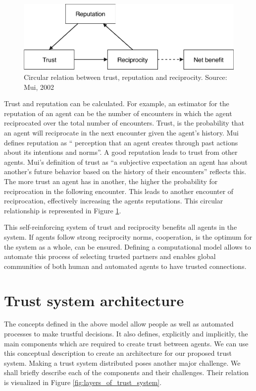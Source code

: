 \begin{figure}[h!]
    \centering
    \includegraphics[width=\textwidth]{images/mui_figure.pdf}
    \caption{Circular relation between trust, reputation and reciprocity. Source: Mui, 2002~\cite{mui2002computational}}
    \label{fig:mui}
\end{figure}

Trust and reputation can be calculated. For example, an estimator for the reputation
of an agent can be the number of encounters in which the agent reciprocated over the total number of 
encounters. Trust, is the probability that an agent will reciprocate in the next encounter given 
the agent's history. Mui defines reputation as ``
perception that an agent creates through past actions about its intentions and norms''. A good 
reputation leads to trust from other agents. Mui's definition of trust as ``a subjective expectation
an agent has about another's future behavior based on the history of their encounters'' reflects
this. The more trust an agent has in another, the higher the probability for reciprocation in the following
encounter. This leads to another encounter of reciprocation, effectively increasing the agents 
reputations. This circular relationship is represented in Figure \ref{fig:mui}. 


This self-reinforcing system of trust and reciprocity benefits all agents in the system. If agents
follow strong reciprocity norms, cooperation, is the optimum for the system as a whole, can be ensured.
Defining a computational model allows to automate this process of selecting trusted partners
and enables global communities of both human and automated agents to have trusted connections.

\section{Trust system architecture}
The concepts defined in the above model allow people as well as automated processes to make 
trustful decisions. It also defines, explicitly and implicitly, the main components which are 
required to create trust between agents. We can use this conceptual description to create an 
architecture for our proposed trust system. Making a trust system distributed poses another major 
challenge. We shall briefly describe each of the components and their challenges. Their relation is
visualized in Figure \ref{fig:layers_of_trust_system}.

